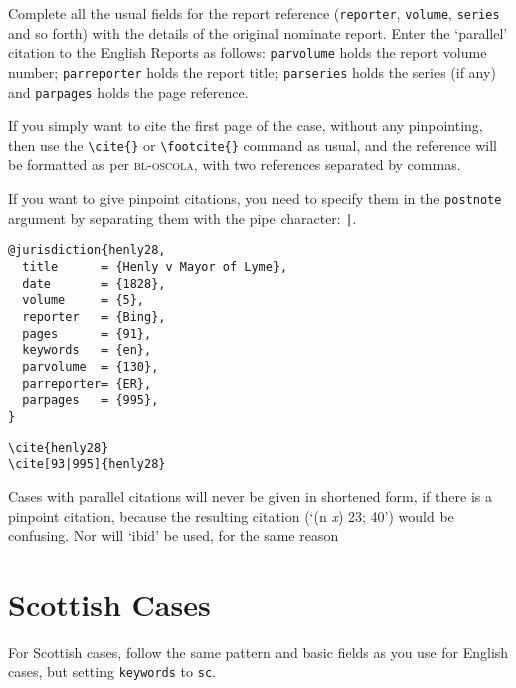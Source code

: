 \documentclass[a4paper,
               11pt,
	       DIV=1,			   
	       footinclude=false]
	      {scrartcl}
\newcommand{\oscola}{\textsc{bl-oscola}}
\newcounter{egcounter}\setcounter{egcounter}{0}
\newlength{\boxwidth}
\newenvironment{bibexample}[1][]
{%
  \medskip\par\noindent\ignorespaces
  \marginpar{[\refstepcounter{egcounter}\arabic{egcounter}]\label{#1}}%
  \setlength{\boxwidth}{0.95\linewidth}%
  \addtolength{\boxwidth}{-2\fboxsep}
  \addtolength{\boxwidth}{-2\fboxrule}
  \begin{lrbox}{\boxcontainer}
  \begin{minipage}[t]{\boxwidth}%
}
{%
  \end{minipage}\end{lrbox}%
  \colorbox{gray!30}{\usebox{\boxcontainer}}
  \par\medskip}
\newcommand{\egcite}[1]{{\texttt{\textbackslash cite#1}}}
\begin{document}
Complete all the usual fields for the report reference
(\texttt{reporter}, \texttt{volume}, \texttt{series} and so forth)
with the details of the original nominate report. Enter the `parallel'
citation to the English Reports as follows: \texttt{parvolume} holds the
report volume number; \texttt{parreporter} holds the report title;
\texttt{parseries} holds the series (if any) and \texttt{parpages} holds the
page reference.

If you simply want to cite the first page of the case, without any
pinpointing, then use the \verb|\cite{}| or \verb|\footcite{}| command
as usual, and the reference will be formatted as per \oscola, with two
references separated by commas.

If you want to give pinpoint citations, you need to specify them in
the \texttt{postnote} argument by separating them with the pipe character: \texttt{|}.

\begin{bibexample}[henly28]
\begin{verbatim}
@jurisdiction{henly28,
  title      = {Henly v Mayor of Lyme},
  date       = {1828},
  volume     = {5},
  reporter   = {Bing},
  pages      = {91},
  keywords   = {en},
  parvolume  = {130},
  parreporter= {ER},
  parpages   = {995},
}
\end{verbatim}
\end{bibexample}

\begin{description}%
\item[\egcite{\{henly28\}}] 
\item[\egcite{[93|995]\{henly28\}}] \cite[93|995]{henly28}
\end{description}

Cases with parallel citations will never be given in shortened form,
if there is a pinpoint citation, because the resulting citation (`(n
\emph{x}) 23; 40') would be confusing. Nor will `ibid' be used, for
the same reason


\section{Scottish Cases}

For Scottish cases, follow the same pattern and basic fields as you
use for English cases, but setting \texttt{keywords} to \texttt{sc}.
\end{document}
